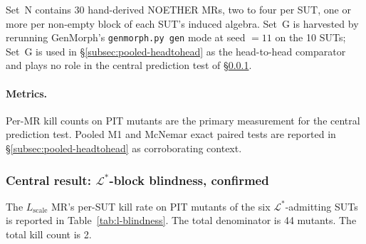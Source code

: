 \documentclass[acmsmall, screen]{acmart}
\begin{document}
Set~N contains 30 hand-derived NOETHER MRs, two to four per SUT, one
or more per non-empty block of each SUT's induced algebra. Set~G is
harvested by rerunning GenMorph's \texttt{genmorph.py gen} mode at
seed $=11$ on the 10 SUTs; Set~G is used in
\S\ref{subsec:pooled-headtohead} as the head-to-head comparator and
plays no role in the central prediction test of
\S\ref{subsec:l-blindness-confirmed}.

\paragraph{Metrics.}
Per-MR kill counts on PIT mutants are the primary measurement for the
central prediction test. Pooled M1 and McNemar exact paired tests are
reported in \S\ref{subsec:pooled-headtohead} as corroborating
context.

\subsubsection{Central result: \texorpdfstring{$\mathcal{L}^{*}$}{L*}-block blindness, confirmed}
\label{subsec:l-blindness-confirmed}

The $L_{\mathrm{scale}}$ MR's per-SUT kill rate on PIT mutants of the
six $\mathcal{L}^{*}$-admitting SUTs is reported in
Table~\ref{tab:l-blindness}. The total denominator is 44 mutants. The
total kill count is 2.
\end{document}
